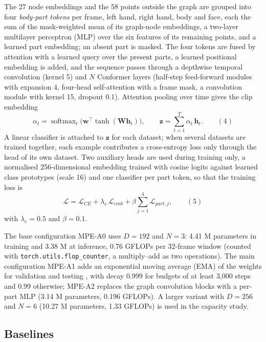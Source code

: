 \documentclass[a4paper,fleqn]{cas-dc}
\begin{document}
The 27 node embeddings and the 58 points outside the graph are grouped into four \emph{body-part tokens} per frame, left hand, right hand, body and face, each the sum of the mask-weighted mean of its graph-node embeddings, a two-layer multilayer perceptron (MLP) over the six features of its remaining points, and a learned part embedding; an absent part is masked. The four tokens are fused by attention with a learned query over the present parts, a learned positional embedding is added, and the sequence passes through a depthwise temporal convolution (kernel 5) and \(N\) Conformer layers \cite{2020_gulati_conformer} (half-step feed-forward modules with expansion 4, four-head self-attention with a frame mask, a convolution module with kernel 15, dropout 0.1). Attention pooling over time gives the clip embedding \[\alpha_{t} = \operatorname{softmax}_{t}\big(\mathbf{w}^{\top}\tanh(\mathbf{W}\mathbf{h}_{t})\big),\qquad \mathbf{z} = \sum_{t=1}^{T}\alpha_{t}\,\mathbf{h}_{t}.\qquad(4)\] A linear classifier is attached to \(\mathbf{z}\) for each dataset; when several datasets are trained together, each example contributes a cross-entropy loss only through the head of its own dataset. Two auxiliary heads are used during training only, a normalised 256-dimensional embedding trained with cosine logits against learned class prototypes (scale 16) and one classifier per part token, so that the training loss is \[\mathcal{L} = \mathcal{L}_{CE} + \lambda_{e}\,\mathcal{L}_{emb} + \beta\sum_{j=1}^{4}\mathcal{L}_{part,j},\qquad(5)\] with \(\lambda_e = 0.5\) and \(\beta = 0.1\).

The base configuration MPE-A0 uses \(D = 192\) and \(N = 3\): 4.41 M parameters in training and 3.38 M at inference, 0.76 GFLOPs per 32-frame window (counted with \texttt{torch.utils.flop\_counter}, a multiply--add as two operations). The main configuration MPE-A1 adds an exponential moving average (EMA) of the weights for validation and testing \cite{1992_polyak_averaging}, with decay 0.999 for budgets of at least 3,000 steps and 0.99 otherwise; MPE-A2 replaces the graph convolution blocks with a per-part MLP (3.14 M parameters, 0.196 GFLOPs). A larger variant with \(D = 256\) and \(N = 6\) (10.27 M parameters, 1.33 GFLOPs) is used in the capacity study.

\hypertarget{baselines}{%
\subsection{Baselines}\label{baselines}}
\end{document}
